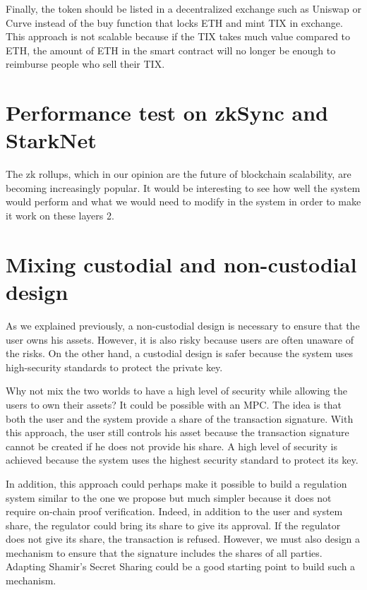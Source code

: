 \documentclass[a4paper,11pt,oneside]{report}
\begin{document}
Finally, the token should be listed in a decentralized exchange such as Uniswap or Curve instead of the buy function that locks ETH and mint TIX in exchange. This approach is not scalable because if the TIX takes much value compared to ETH, the amount of ETH in the smart contract will no longer be enough to reimburse people who sell their TIX.

\section{Performance test on zkSync and StarkNet}
The zk rollups, which in our opinion are the future of blockchain scalability, are becoming increasingly popular. It would be interesting to see how well the system would perform and what we would need to modify in the system in order to make it work on these layers 2.

\section{Mixing custodial and non-custodial design}
As we explained previously, a non-custodial design is necessary to ensure that the user owns his assets. However, it is also risky because users are often unaware of the risks. On the other hand, a custodial design is safer because the system uses high-security standards to protect the private key.

Why not mix the two worlds to have a high level of security while allowing the users to own their assets? It could be possible with an MPC. The idea is that both the user and the system provide a share of the transaction signature. With this approach, the user still controls his asset because the transaction signature cannot be created if he does not provide his share. A high level of security is achieved because the system uses the highest security standard to protect its key.

In addition, this approach could perhaps make it possible to build a regulation system similar to the one we propose but much simpler because it does not require on-chain proof verification. Indeed, in addition to the user and system share, the regulator could bring its share to give its approval. If the regulator does not give its share, the transaction is refused. However, we must also design a mechanism to ensure that the signature includes the shares of all parties. Adapting Shamir's Secret Sharing could be a good starting point to build such a mechanism.

\end{document}
